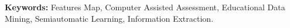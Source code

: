 \noindent

\par
\vspace{1em}
\noindent\textbf{Keywords:} Features Map, Computer Assisted Assessment,  Educational Data Mining, Semiautomatic Learning, Information Extraction.




\clearpage
\pagestyle{headings}


\pagestyle{fancyplain}

\renewcommand{\chaptermark}[1]{\markboth{\thechapter.\ {#1}}{}}

\addtolength{\headheight}{\baselineskip}

\fancyhf{}
\fancyhead[L]{\nouppercase{\textsf{\leftmark}}}
\fancyhead[R]{\thepage}


\setcounter{page}{10}






\newpage

\listoffigures



\listoftables




\tableofcontents
